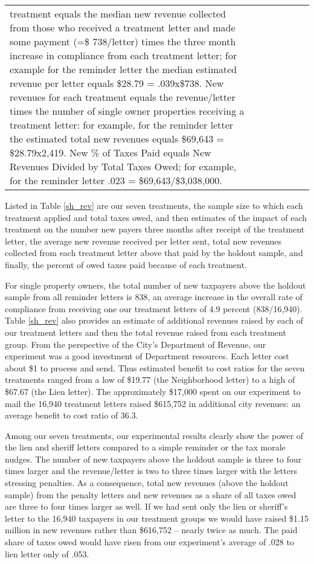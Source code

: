 \documentclass[12pt]{article}
\begin{document}
\begin{table}[htb]
\begin{tabular}{lcccccc}
{  treatment equals the median new revenue collected from those who
  received a treatment letter and made some payment (=\$ 738/letter)
  times the three month increase in compliance from each treatment
  letter; for example for the reminder letter the median estimated
  revenue per letter equals \$28.79 = .039x\$738.  New revenues for
  each treatment equals the revenue/letter times the number of single
  owner properties receiving a treatment letter: for example, for the
  reminder letter the estimated total new revenues equals \$69,643 =
  \$28.79x2,419.  New \% of Taxes Paid equals New Revenues Divided by
  Total Taxes Owed; for example, for the reminder letter .023 =
  \$69,643/\$3,038,000.}
\end{tabular}
\end{table}

Listed in Table \ref{sh_rev} are our seven treatments, the sample size
to which each treatment applied and total taxes owed, and then
estimates of the impact of each treatment on the number new payers
three months after receipt of the treatment letter, the average new
revenue received per letter sent, total new revenues collected from
each treatment letter above that paid by the holdout sample, and
finally, the percent of owed taxes paid because of each treatment.

For single property owners, the total number of new taxpayers above
the holdout sample from all reminder letters is 838, an average
increase in the overall rate of compliance from receiving one our
treatment letters of 4.9 percent (838/16,940).  Table \ref{sh_rev}
also provides an estimate of additional revenues raised by each of our
treatment letters and then the total revenue raised from each
treatment group.  From the perspective of the City's Department of
Revenue, our experiment was a good investment of Department resources.
Each letter cost about \$1 to process and send.  Thus estimated
benefit to cost ratios for the seven treatments ranged from a low of
\$19.77 (the Neighborhood letter) to a high of \$67.67 (the Lien
letter).  The approximately \$17,000 spent on our experiment to mail
the 16,940 treatment letters raised \$615,752 in additional city
revenues: an average benefit to cost ratio of 36.3.

Among our seven treatments, our experimental results clearly show the
power of the lien and sheriff letters compared to a simple reminder or
the tax morale nudges.  The number of new taxpayers above the holdout
sample is three to four times larger and the revenue/letter is two to
three times larger with the letters stressing penalties.  As a
consequence, total new revenues (above the holdout sample) from the
penalty letters and new revenues as a share of all taxes owed are
three to four times larger as well.  If we had sent only the lien or
sheriff's letter to the 16,940 taxpayers in our treatment groups we
would have raised \$1.15 million in new revenues rather than \$616,752
-- nearly twice as much.  The paid share of taxes owed would have
risen from our experiment's average of .028 to lien letter only of
.053.
\end{document}
